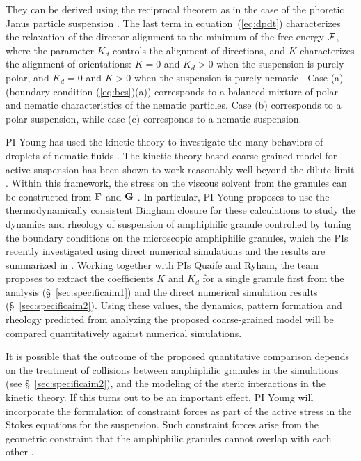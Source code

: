  They can be derived using the reciprocal theorem as in the case of 
the phoretic Janus particle suspension \cite{TraversoMichellin2020_PRF,TraversoMichellin2022_JFM}.
The last term in equation~(\ref{eq:dpdt}) characterizes the relaxation of the director alignment to the minimum of the
free energy ${\cal F}$, where the parameter $K_d$ controls the alignment of directions, and $K$ characterizes the alignment of orientations:
$K=0$ and $K_d > 0$ when the suspension is purely polar, and $K_d=0$  and $K>0$ when the suspension is purely nematic \cite{Amiri2022_JPhysA}. 
%
Case (a) (boundary condition (\ref{eq:bcs})(a)) corresponds to a balanced mixture of polar and nematic characteristics of the nematic particles.
Case (b) corresponds to a polar suspension, while case (c) corresponds to a nematic suspension. 

PI Young has used the kinetic theory to investigate the many behaviors of droplets of
nematic fluids \cite{YoungShelleyStein2021_MBE}. 
The kinetic-theory based coarse-grained model for active suspension has been shown to work reasonably well beyond the dilute limit \cite{Saintillan2018_ARFM}.
Within this framework, the stress on the viscous solvent from the granules can be constructed from ${\bf F}$ and ${\bf G}$ \cite{TraversoMichellin2020_PRF,TraversoMichellin2022_JFM}.
In particular, PI Young proposes to use the thermodynamically consistent Bingham closure \cite{YoungShelleyStein2021_MBE} for these calculations to study the
dynamics and rheology of suspension of amphiphilic granule controlled by tuning the boundary conditions on the microscopic amphiphilic granules, 
which the PIs recently investigated using direct numerical simulations and the results are summarized in \cite{fu-ryh-qua-you2022}. Working together with PIs Quaife and Ryham, the team proposes to extract the coefficients
$K$ and $K_d$ for a single granule first from the analysis (\S~\ref{sec:specificaim1}) and the direct numerical simulation results (\S~\ref{sec:specificaim2}). 
Using these values, the dynamics, pattern formation and rheology
predicted from analyzing the proposed coarse-grained model will be compared quantitatively against numerical simulations. 

It is possible that the outcome of the proposed quantitative comparison depends on the treatment of collisions between amphiphilic granules 
in the simulations (see \S~\ref{sec:specificaim2}), 
and the modeling of the steric interactions in the kinetic theory. If this turns out to be an important effect, PI Young will incorporate the formulation of constraint forces as part of the active stress in the Stokes equations for the suspension.  Such constraint forces arise from the geometric 
constraint that the amphiphilic granules cannot overlap with each other \cite{Weady2022_PRF}. 

